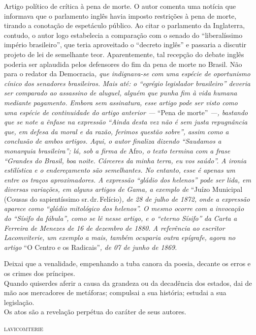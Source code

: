 \begin{didascalia}
Artigo político de crítica à pena de morte. O autor comenta uma notícia
que informava que o parlamento inglês havia imposto restrições à pena de
morte, tirando a conotação de espetáculo público. Ao citar o parlamento
da Inglaterra, contudo, o autor logo estabelecia a comparação com o
senado do ``liberalíssimo império brasileiro'', que teria aproveitado o
``decreto inglês'' e passaria a discutir projeto de lei de semelhante
teor. Aparentemente, tal recepção do debate inglês poderia ser aplaudida
pelos defensores do fim da pena de morte no Brasil. Não para o redator
da Democracia\emph{, que indignava-se com uma espécie de oportunismo
cínico dos senadores brasileiros. Mais até: o ``egrégio legislador
brasileiro'' deveria ser comparado ao assassino de aluguel, alguém que
punha fim à vida humana mediante pagamento. Embora sem assinatura, esse
artigo pode ser visto como uma espécie de continuidade do artigo
anterior ---} ``Pena de morte'' \emph{---, bastando que se note a ênfase na
expressão ``Ainda desta vez não é sem justa repugnância que, em defesa da
moral e da razão, ferimos questão sobre'', assim como a conclusão de
ambos artigos. Aqui, o autor finaliza dizendo ``Saudamos a monarquia
brasileira''; lá, sob a firma de} Afro\emph{, o texto termina com a frase
``Grandes do Brasil, boa noite. Cárceres da minha terra, eu vos saúdo''. A
ironia estilística e o endereçamento são semelhantes. No entanto, esse é
apenas um entre os traços aproximadores. A expressão ``gládio dos
helenos'' pode ser lida, em diversas variações, em alguns artigos de
Gama, a exemplo de} ``Juízo Municipal (Cousas do sapientíssimo sr.\,dr.\,Felício)\emph{, de 28 de julho de 1872, onde a expressão aparece como ``gládio
mitológico dos helenos''. O mesmo ocorre com a invocação do ``Sísifo da
fábula'', como se lê nesse artigo, e o ``eterno Sísifo'' da Carta a
Ferreira de Menezes de 16 de dezembro de 1880. A referência ao escritor
Lacomviterie, um exemplo a mais, também ocuparia outra epígrafe, agora
no artigo} ``O Centro e os Radicais''\emph{, de 07 de junho de 1869.}
\end{didascalia}



\epigraph{Deixai que a venalidade, empenhando a tuba\footnotemark{} canora\footnotemark{} da
poesia, decante os erros e os crimes dos príncipes.\\
Quando quiserdes aferir a causa da grandeza ou da decadência dos
estados, dai de mão aos mercadores de metáforas; compulsai\footnotemark{} a sua história; estudai a sua legislação.\\
Os atos são a revelação perpétua do caráter de seus autores.}{\textsc{lavicomterie}\footnotemark}



